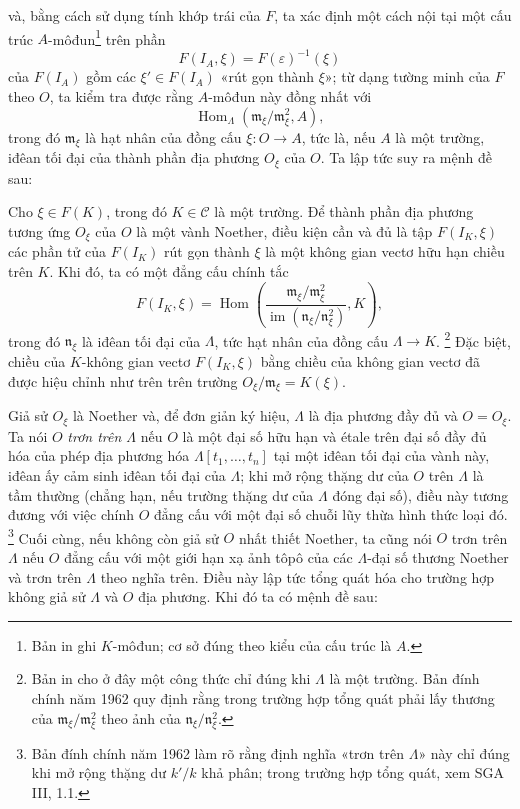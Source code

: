 và, bằng cách sử dụng tính khớp trái của $F$, ta xác định một cách nội tại
một cấu trúc $A$-môđun\footnote{Bản in ghi $K$-môđun; cơ sở đúng theo kiểu
của cấu trúc là $A$.} trên phần
\[
  F(I_A,\xi)=F(\varepsilon)^{-1}(\xi)
\]
của $F(I_A)$ gồm các $\xi'\in F(I_A)$ «rút gọn thành $\xi$»; từ dạng tường
minh của $F$ theo $O$, ta kiểm tra được rằng $A$-môđun này đồng nhất với
\[
  \operatorname{Hom}_{\Lambda}(\mathfrak m_\xi/\mathfrak m_\xi^2,A),
\]
trong đó $\mathfrak m_\xi$ là hạt nhân của đồng cấu
$\xi:O\longrightarrow A$, tức là, nếu $A$ là một trường, iđêan tối đại của
thành phần địa phương $O_\xi$ của $O$. Ta lập tức suy ra mệnh đề sau:

 Cho $\xi\in F(K)$, trong đó $K\in\mathcal C$ là một
trường. Để thành phần địa phương tương ứng $O_\xi$ của $O$ là một vành
Noether, điều kiện cần và đủ là tập $F(I_K,\xi)$ các phần tử của $F(I_K)$ rút
gọn thành $\xi$ là một không gian vectơ hữu hạn chiều trên $K$. Khi đó, ta có
một đẳng cấu chính tắc
\[
  F(I_K,\xi)=
  \operatorname{Hom}\!\left(
    \frac{\mathfrak m_\xi/\mathfrak m_\xi^2}
         {\operatorname{im}(\mathfrak n_\xi/\mathfrak n_\xi^2)},K
  \right),
\]
trong đó $\mathfrak n_\xi$ là iđêan tối đại của $\Lambda$, tức hạt nhân của
đồng cấu $\Lambda\longrightarrow K$.
\footnote{Bản in cho ở đây một công thức chỉ đúng khi $\Lambda$ là một
trường. Bản đính chính năm 1962 quy định rằng trong trường hợp tổng quát phải
lấy thương của $\mathfrak m_\xi/\mathfrak m_\xi^2$ theo ảnh của
$\mathfrak n_\xi/\mathfrak n_\xi^2$.}
Đặc biệt, chiều của $K$-không gian vectơ $F(I_K,\xi)$ bằng chiều của không
gian vectơ đã được hiệu chỉnh như trên trên trường
$O_\xi/\mathfrak m_\xi=K(\xi)$.

Giả sử $O_\xi$ là Noether và, để đơn giản ký hiệu, $\Lambda$ là địa phương
đầy đủ và $O=O_\xi$. Ta nói $O$ \emph{trơn trên $\Lambda$} nếu $O$ là một
đại số hữu hạn và étale trên đại số đầy đủ hóa của phép địa phương hóa
$\Lambda[t_1,\ldots,t_n]$ tại một iđêan tối đại của vành này, iđêan ấy cảm
sinh iđêan tối đại của $\Lambda$; khi mở rộng thặng dư của $O$ trên
$\Lambda$ là tầm thường (chẳng hạn, nếu trường thặng dư của $\Lambda$ đóng
đại số), điều này tương đương với việc chính $O$ đẳng cấu với một đại số
chuỗi lũy thừa hình thức loại đó.
\footnote{Bản đính chính năm 1962 làm rõ rằng định nghĩa «trơn trên
$\Lambda$» này chỉ đúng khi mở rộng thặng dư $k'/k$ khả phân; trong trường
hợp tổng quát, xem SGA III, 1.1.}
Cuối cùng, nếu không còn giả sử $O$ nhất thiết Noether, ta cũng nói $O$ trơn
trên $\Lambda$ nếu $O$ đẳng cấu với một giới hạn xạ ảnh tôpô của các
$\Lambda$-đại số thương Noether và trơn trên $\Lambda$ theo nghĩa trên. Điều
này lập tức tổng quát hóa cho trường hợp không giả sử $\Lambda$ và $O$ địa
phương. Khi đó ta có mệnh đề sau:

